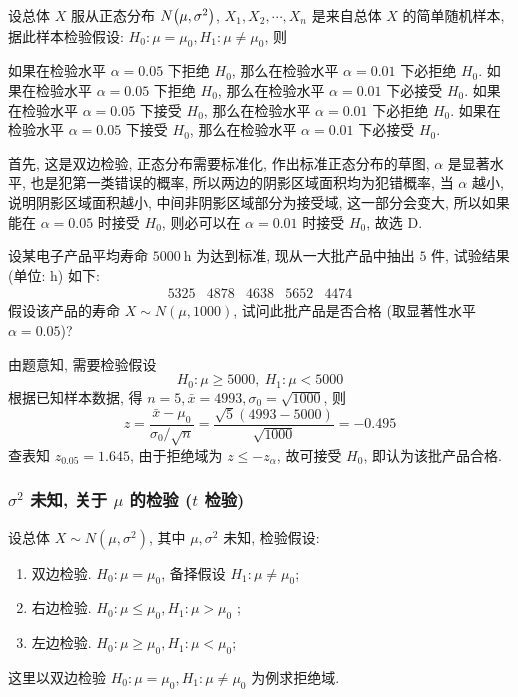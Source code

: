 \begin{example}
    设总体 $X$ 服从正态分布 $N\qty(\mu,\sigma^2)$, $X_1, X_2, \cdots ,X_n$ 是来自总体 $X$ 的简单随机样本, 据此样本检验假设: $H_0:\mu=\mu_0,H_1:\mu\neq \mu_0$, 则
    \begin{tasks}
        \task 如果在检验水平 $\alpha=0.05$ 下拒绝 $H_0$, 那么在检验水平 $\alpha=0.01$ 下必拒绝 $H_0$.
        \task 如果在检验水平 $\alpha=0.05$ 下拒绝 $H_0$, 那么在检验水平 $\alpha=0.01$ 下必接受 $H_0$.
        \task 如果在检验水平 $\alpha=0.05$ 下接受 $H_0$, 那么在检验水平 $\alpha=0.01$ 下必拒绝 $H_0$.
        \task 如果在检验水平 $\alpha=0.05$ 下接受 $H_0$, 那么在检验水平 $\alpha=0.01$ 下必接受 $H_0$.
    \end{tasks}
\end{example}
\begin{solution}
    首先, 这是双边检验, 正态分布需要标准化, 作出标准正态分布的草图, $\alpha$ 是显著水平, 也是犯第一类错误的概率, 所以两边的阴影区域面积均为犯错概率,
    当 $\alpha$ 越小, 说明阴影区域面积越小, 中间非阴影区域部分为接受域, 这一部分会变大, 所以如果能在 $\alpha=0.05$ 时接受 $H_0$, 则必可以在 $\alpha=0.01$ 时接受 $H_0$, 故选 D.
\end{solution}

\begin{example}
    设某电子产品平均寿命 $ 5000 \mathrm{~h} $ 为达到标准, 现从一大批产品中抽出 $5$ 件, 试验结果 (单位: h) 如下:
    $$\begin{array}{lllll}
            5325 & 4878 & 4638 & 5652 & 4474
        \end{array}$$
    假设该产品的寿命 $ X \sim N(\mu, 1000)$, 试问此批产品是否合格 (取显著性水平 $ \alpha=0.05$)?
\end{example}
\begin{solution}
    由题意知, 需要检验假设
    $$H_0:\mu\geqslant 5000,~H_1:\mu<5000$$
    根据已知样本数据, 得 $ n=5, \bar{x}=4993, \sigma_{0}=\sqrt{1000} $, 则
    $$z=\frac{\bar{x}-\mu_{0}}{\sigma_{0} / \sqrt{n}}=\frac{\sqrt{5}(4993-5000)}{\sqrt{1000}}=-0.495$$
    查表知 $ z_{0.05}=1.645 $, 由于拒绝域为 $ z \leqslant-z_{\alpha}$, 故可接受 $ H_{0}$, 即认为该批产品合格.
\end{solution}

\subsubsection{\texorpdfstring{$\sigma^2$}. 未知, 关于 \texorpdfstring{$\mu$}. 的检验 (\texorpdfstring{$t$}. 检验)}

设总体 $ X \sim N\left(\mu, \sigma^{2}\right) $, 其中 $ \mu, \sigma^{2} $ 未知, 检验假设:
\begin{enumerate}[label=(\arabic{*})]
    \item 双边检验. $ H_{0}: \mu=\mu_{0} $, 备择假设 $ H_{1}: \mu \neq \mu_{0} $;
    \item 右边检验. $ H_{0}: \mu \leqslant \mu_{0}, H_{1}: \mu>\mu_{0}$ ;
    \item 左边检验. $ H_{0}: \mu \geqslant \mu_{0}, H_{1}: \mu<\mu_{0} $;
\end{enumerate}
这里以双边检验 $ H_{0}: \mu=\mu_{0}, H_{1}: \mu \neq \mu_{0} $ 为例求拒绝域.

